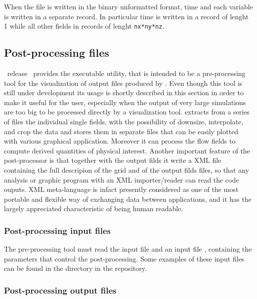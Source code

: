 When the file is written in the binary unformatted format,
time and each variable is written in a separate record.
In particular time is written in a record of lenght 1
while all other fields in records of lenght {\tt nx*ny*nz}.

\subsection{Post-processing files}
\label{sect:pp}

\PDAC\ release \PDACVERSION\ provides the executable  utility,
that is intended to be a pre-processing tool for the visualization of
output files produced by \PDAC. Even though this tool is still under 
development its usage is shortly described in this section in order to make it
useful for the user, especially when the output of very large simulations
are too big to be processed directly by a visualization tool.
 extracts from a series of  files the individual single fields,
with the possibility of downsize, interpolate, and crop the data
and stores them in separate files that can be easily plotted with
various graphical application. Moreover it can process the flow fields to
compute derived quantities of physical interest. 
Another important feature of the post-processor  is that
together with the output filds it write a XML file containing the
full descripion of the grid and of the output filds files, so that
any analysis or graphic program with an XML importer/reader can
read the code ouputs. XML meta-language is infact presently 
considered as one of the most portable and flexible way of 
exchanging data between applications, and it has the largely
appreciated characteristic of being human readable.

\subsubsection{Post-processing input files}

The pre-processing tool must read the input file  and an
input file , containing the parameters that control the post-processing.
Some examples of these input files can be found in the  directory
in the repository.

\subsubsection{Post-processing output files}

